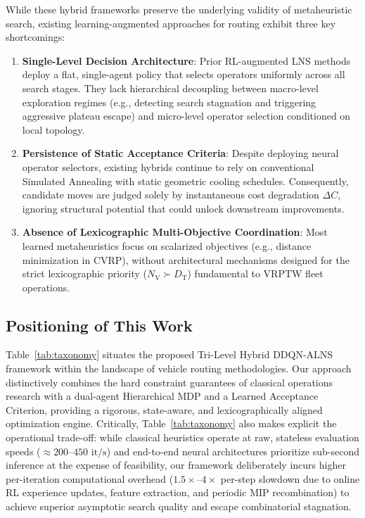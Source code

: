 \documentclass{ieeeaccess}
\newcommand{\NV}{{N_\mathrm{V}}}
\newcommand{\TD}{{D_\mathrm{T}}}
\begin{document}
While these hybrid frameworks preserve the underlying validity of metaheuristic search, existing learning-augmented approaches for routing exhibit three key shortcomings:
\begin{enumerate}
    \item \textbf{Single-Level Decision Architecture}: Prior RL-augmented LNS methods deploy a flat, single-agent policy that selects operators uniformly across all search stages. They lack hierarchical decoupling between macro-level exploration regimes (e.g., detecting search stagnation and triggering aggressive plateau escape) and micro-level operator selection conditioned on local topology.
    \item \textbf{Persistence of Static Acceptance Criteria}: Despite deploying neural operator selectors, existing hybrids continue to rely on conventional Simulated Annealing with static geometric cooling schedules. Consequently, candidate moves are judged solely by instantaneous cost degradation $\Delta C$, ignoring structural potential that could unlock downstream improvements.
    \item \textbf{Absence of Lexicographic Multi-Objective Coordination}: Most learned metaheuristics focus on scalarized objectives (e.g., distance minimization in CVRP), without architectural mechanisms designed for the strict lexicographic priority ($\NV \succ \TD$) fundamental to VRPTW fleet operations.
\end{enumerate}

\subsection{Positioning of This Work}
\label{sec:rw_positioning}

Table~\ref{tab:taxonomy} situates the proposed Tri-Level Hybrid DDQN-ALNS framework within the landscape of vehicle routing methodologies. Our approach distinctively combines the hard constraint guarantees of classical operations research with a dual-agent Hierarchical MDP and a Learned Acceptance Criterion, providing a rigorous, state-aware, and lexicographically aligned optimization engine. Critically, Table~\ref{tab:taxonomy} also makes explicit the operational trade-off: while classical heuristics operate at raw, stateless evaluation speeds ($\approx 200\text{--}450\text{ it/s}$) and end-to-end neural architectures prioritize sub-second inference at the expense of feasibility, our framework deliberately incurs higher per-iteration computational overhead ($1.5\times\text{--}4\times$ per-step slowdown due to online RL experience updates, feature extraction, and periodic MIP recombination) to achieve superior asymptotic search quality and escape combinatorial stagnation.
\end{document}
